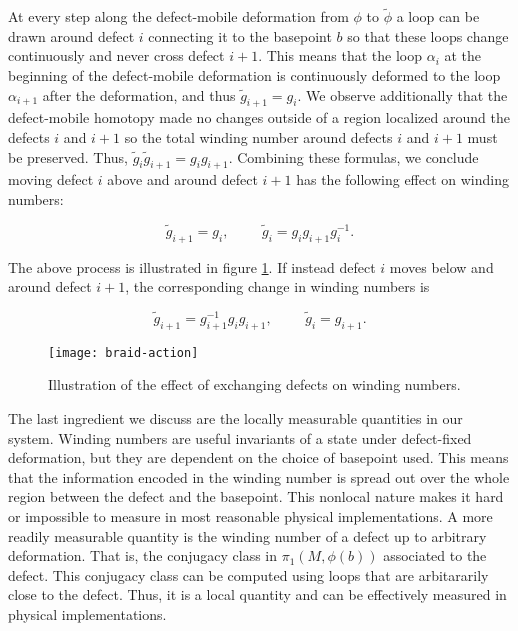At every step along the defect-mobile deformation from $\phi$ to $\tilde{\phi}$ a loop can be drawn around defect $i$ connecting it to the basepoint $b$ so that these loops change continuously and never cross defect $i+1$. This means that the loop $\alpha_i$ at the beginning of the defect-mobile deformation is continuously deformed to the loop $\alpha_{i+1}$ after the deformation, and thus $\tilde{g}_{i+1}=g_i$. We observe additionally that the defect-mobile homotopy made no changes outside of a region localized around the defects $i$ and $i+1$ so the total winding number around defects $i$ and $i+1$ must be preserved. Thus, $\tilde{g}_i\tilde{g}_{i+1}=g_ig_{i+1}$. Combining these formulas, we conclude moving defect $i$ above and around defect $i+1$ has the following effect on winding numbers:

$$\tilde{g}_{i+1}=g_i,\,\,\,\,\,\,\,\,\,\,\,\,\,\, \tilde{g}_i=g_{i}g_{i+1}g_{i}^{-1}.$$ 

The above process is illustrated in figure \ref{braid-action}. If instead defect $i$ moves below and around defect $i+1$, the corresponding change in winding numbers is 

$$\tilde{g}_{i+1}=g_{i+1}^{-1}g_ig_{i+1},\,\,\,\,\,\,\,\,\,\,\,\,\,\, \tilde{g}_{i}=g_{i+1}.$$ 

\begin{figure}
\begin{center}
\texttt{[image: braid-action]}
\caption{Illustration of the effect of exchanging defects on winding numbers.}
\label{braid-action}
\end{center}
\end{figure}

The last ingredient we discuss are the locally measurable quantities in our system. Winding numbers are useful invariants of a state under defect-fixed deformation, but they are dependent on the choice of basepoint used. This means that the information encoded in the winding number is spread out over the whole region between the defect and the basepoint. This nonlocal nature makes it hard or impossible to measure in most reasonable physical implementations. A more readily measurable quantity is the winding number of a defect up to arbitrary deformation. That is, the conjugacy class in $\pi_1(M,\phi(b))$ associated to the defect. This conjugacy class can be computed using loops that are arbitararily close to the defect. Thus, it is a local quantity and can be effectively measured in physical implementations.

